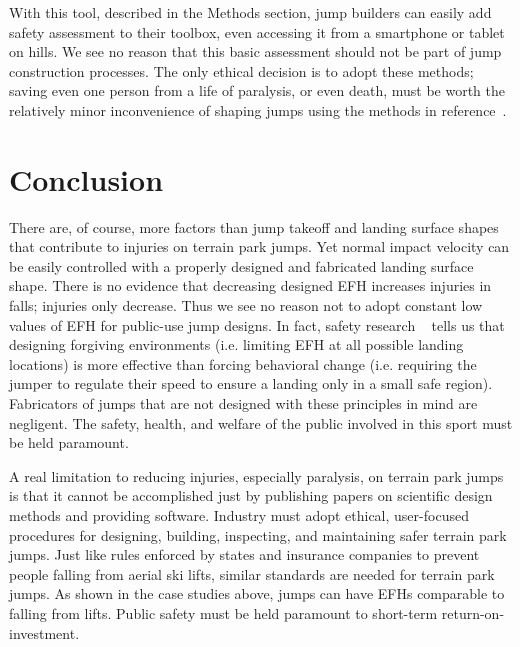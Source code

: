 \documentclass[smallextended]{svjour3}       %
\begin{document}
With
this tool, described in the Methods section, jump builders can easily add safety
assessment to their toolbox, even accessing it from a smartphone or tablet on hills.  We
see no reason that this basic assessment should not be part of jump
construction processes. The only ethical decision is to adopt these methods;
saving even one person from a life of paralysis, or even death, must be worth
the relatively minor inconvenience of shaping jumps using the methods in
reference~\cite{Levy2015}.

\section{Conclusion}
\label{sec:conc}
%
There are, of course, more factors than jump takeoff and landing surface shapes that
contribute to injuries on terrain park jumps. Yet normal impact velocity can be easily
controlled with a properly designed and fabricated landing surface shape. There is no evidence that
decreasing designed EFH increases injuries in falls; injuries only decrease.  Thus
we see no reason not to adopt constant low values of EFH for public-use jump
designs. In fact, safety research ~\cite{Smith} tells us that designing forgiving environments (i.e. limiting EFH at all possible landing locations) is more effective than forcing behavioral change (i.e. requiring the jumper to regulate their speed to ensure a landing only in a small safe region).
Fabricators of jumps that are not designed with these principles in mind are
negligent. The safety, health, and welfare of the public involved in this sport
must be held paramount.

A real limitation to reducing injuries, especially paralysis, on terrain park
jumps is that it cannot be accomplished just by publishing papers on scientific
design methods and providing software. Industry must adopt ethical, user-focused procedures
for designing, building, inspecting, and maintaining safer terrain park jumps.
Just like rules enforced by states and insurance companies to prevent people
 falling from aerial ski lifts, similar standards are needed for terrain park
jumps. As shown in the case studies above, jumps can have EFHs comparable to falling from lifts. Public safety
must be held paramount to short-term return-on-investment.
\end{document}
